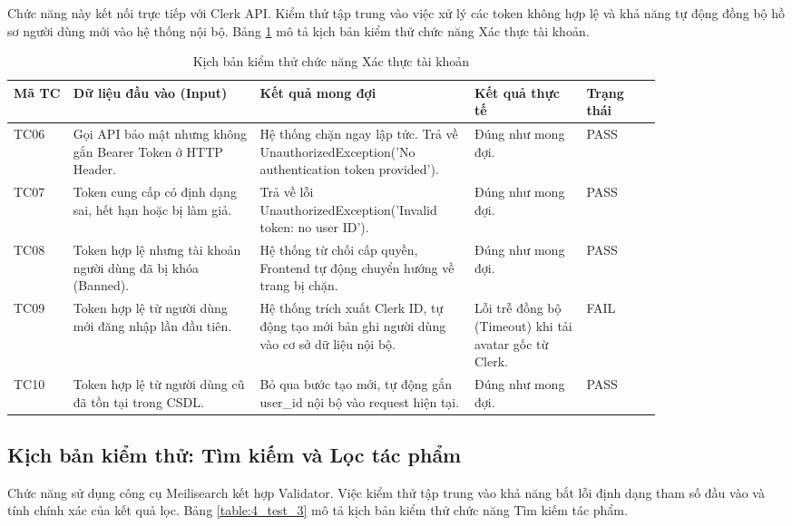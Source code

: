 Chức năng này kết nối trực tiếp với Clerk API. Kiểm thử tập trung vào việc xử lý các token không hợp lệ và khả năng tự động đồng bộ hồ sơ người dùng mới vào hệ thống nội bộ. Bảng \ref{table:4_test_2} mô tả kịch bản kiểm thử chức năng Xác thực tài khoản.

\begin{table}[h!]
\caption{Kịch bản kiểm thử chức năng Xác thực tài khoản}
\label{table:4_test_2}
\centering
\small
\renewcommand{\arraystretch}{1.3}
\begin{tabular}{|p{0.08\linewidth}|p{0.25\linewidth}|p{0.25\linewidth}|p{0.15\linewidth}|p{0.1\linewidth}|}
\hline
\textbf{Mã TC} & \textbf{Dữ liệu đầu vào (Input)} & \textbf{Kết quả mong đợi} & \textbf{Kết quả thực tế} & \textbf{Trạng thái} \\ \hline
TC06 & Gọi API bảo mật nhưng không gắn Bearer Token ở HTTP Header. & Hệ thống chặn ngay lập tức. Trả về UnauthorizedException('No authentication token provided'). & Đúng như mong đợi. & PASS \\ \hline
TC07 & Token cung cấp có định dạng sai, hết hạn hoặc bị làm giả. & Trả về lỗi UnauthorizedException('Invalid token: no user ID'). & Đúng như mong đợi. & PASS \\ \hline
TC08 & Token hợp lệ nhưng tài khoản người dùng đã bị khóa (Banned). & Hệ thống từ chối cấp quyền, Frontend tự động chuyển hướng về trang bị chặn. & Đúng như mong đợi. & PASS \\ \hline
TC09 & Token hợp lệ từ người dùng mới đăng nhập lần đầu tiên. & Hệ thống trích xuất Clerk ID, tự động tạo mới bản ghi người dùng vào cơ sở dữ liệu nội bộ. & Lỗi trễ đồng bộ (Timeout) khi tải avatar gốc từ Clerk. & FAIL \\ \hline
TC10 & Token hợp lệ từ người dùng cũ đã tồn tại trong CSDL. & Bỏ qua bước tạo mới, tự động gắn user\_id nội bộ vào request hiện tại. & Đúng như mong đợi. & PASS \\ \hline
\end{tabular}
\end{table}
\FloatBarrier

\subsection{Kịch bản kiểm thử: Tìm kiếm và Lọc tác phẩm}

Chức năng sử dụng công cụ Meilisearch kết hợp Validator. Việc kiểm thử tập trung vào khả năng bắt lỗi định dạng tham số đầu vào và tính chính xác của kết quả lọc. Bảng \ref{table:4_test_3} mô tả kịch bản kiểm thử chức năng Tìm kiếm tác phẩm.

